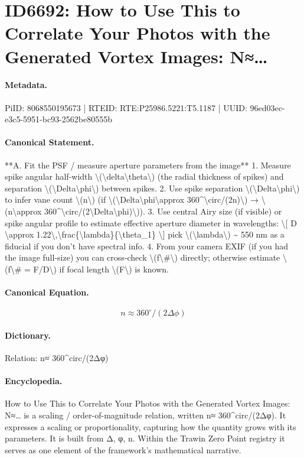 \section*{ID6692: How to Use This to Correlate Your Photos with the Generated Vortex Images: N≈…}
\paragraph{Metadata.}
PiID: 8068550195673 | RTEID: RTE:P25986.5221:T5.1187 | UUID: 96ed03ec-e3c5-5951-bc93-2562be80555b

\paragraph{Canonical Statement.}
**A. Fit the PSF / measure aperture parameters from the image** 1. Measure spike angular half-width \textbackslash{}(\textbackslash{}delta\textbackslash{}theta\textbackslash{}) (the radial thickness of spikes) and separation \textbackslash{}(\textbackslash{}Delta\textbackslash{}phi\textbackslash{}) between spikes. 2. Use spike separation \textbackslash{}(\textbackslash{}Delta\textbackslash{}phi\textbackslash{}) to infer vane count \textbackslash{}(n\textbackslash{}) (if \textbackslash{}(\textbackslash{}Delta\textbackslash{}phi\textbackslash{}approx 360\textasciicircum{}\textbackslash{}circ/(2n)\textbackslash{}) → \textbackslash{}(n\textbackslash{}approx 360\textasciicircum{}\textbackslash{}circ/(2\textbackslash{}Delta\textbackslash{}phi)\textbackslash{})). 3. Use central Airy size (if visible) or spike angular profile to estimate effective aperture diameter in wavelengths: \textbackslash{}[ D \textbackslash{}approx 1.22\textbackslash{},\textbackslash{}frac\{\textbackslash{}lambda\}\{\textbackslash{}theta\_1\} \textbackslash{}] pick \textbackslash{}(\textbackslash{}lambda\textbackslash{}) \textasciitilde{} 550 nm as a fiducial if you don’t have spectral info. 4. From your camera EXIF (if you had the image full-size) you can cross-check \textbackslash{}(f\textbackslash{}\#\textbackslash{}) directly; otherwise estimate \textbackslash{}(f\textbackslash{}\# = F/D\textbackslash{}) if focal length \textbackslash{}(F\textbackslash{}) is known.

\paragraph{Canonical Equation.}
\[
n\approx 360^\circ/(2\Delta\phi)
\]

\paragraph{Dictionary.}
Relation: n≈ 360\textasciicircum{}circ/(2Δφ)

\paragraph{Encyclopedia.}
How to Use This to Correlate Your Photos with the Generated Vortex Images: N≈… is a scaling / order-of-magnitude relation, written n≈ 360\textasciicircum{}circ/(2Δφ). It expresses a scaling or proportionality, capturing how the quantity grows with its parameters. It is built from Δ, φ, n. Within the Trawin Zero Point registry it serves as one element of the framework's mathematical narrative.
